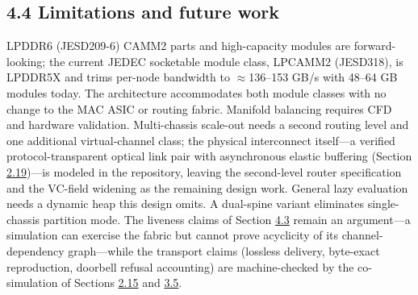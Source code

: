 \documentclass[12pt,onecolumn]{article}
\begin{document}
\subsection*{4.4 Limitations and future work}\label{sec:4.4}

LPDDR6 (JESD209-6)\cite{17} CAMM2 parts and high-capacity modules are forward-looking; the current JEDEC socketable module class, LPCAMM2 (JESD318), is LPDDR5X and trims per-node bandwidth to $\approx$136--153 GB/s with 48--64 GB modules today\cite{16,17}. The architecture accommodates both module classes with no change to the MAC ASIC or routing fabric. Manifold balancing requires CFD and hardware validation. Multi-chassis scale-out needs a second routing level and one additional virtual-channel class; the physical interconnect itself---a verified protocol-transparent optical link pair with asynchronous elastic buffering (Section \hyperref[sec:2.19]{2.19})---is modeled in the repository, leaving the second-level router specification and the VC-field widening as the remaining design work. General lazy evaluation needs a dynamic heap this design omits. A dual-spine variant eliminates single-chassis partition mode. The liveness claims of Section \hyperref[sec:4.3]{4.3} remain an argument---a simulation can exercise the fabric but cannot prove acyclicity of its channel-dependency graph\cite{9}---while the transport claims (lossless delivery, byte-exact reproduction, doorbell refusal accounting) are machine-checked by the co-simulation of Sections \hyperref[sec:2.15]{2.15} and \hyperref[sec:3.5]{3.5}.
\end{document}
